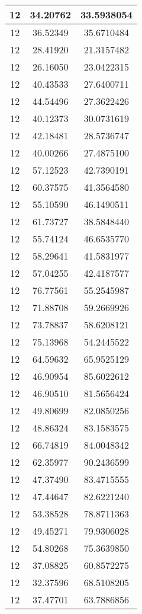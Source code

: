 \documentclass[
]{book}
\begin{document}
\begin{tabular}{c|c|c}
\hline
12 & 34.20762 & 33.5938054\\
\hline
12 & 36.52349 & 35.6710484\\
\hline
12 & 28.41920 & 21.3157482\\
\hline
12 & 26.16050 & 23.0422315\\
\hline
12 & 40.43533 & 27.6400711\\
\hline
12 & 44.54496 & 27.3622426\\
\hline
12 & 40.12373 & 30.0731619\\
\hline
12 & 42.18481 & 28.5736747\\
\hline
12 & 40.00266 & 27.4875100\\
\hline
12 & 57.12523 & 42.7390191\\
\hline
12 & 60.37575 & 41.3564580\\
\hline
12 & 55.10590 & 46.1490511\\
\hline
12 & 61.73727 & 38.5848440\\
\hline
12 & 55.74124 & 46.6535770\\
\hline
12 & 58.29641 & 41.5831977\\
\hline
12 & 57.04255 & 42.4187577\\
\hline
12 & 76.77561 & 55.2545987\\
\hline
12 & 71.88708 & 59.2669926\\
\hline
12 & 73.78837 & 58.6208121\\
\hline
12 & 75.13968 & 54.2445522\\
\hline
12 & 64.59632 & 65.9525129\\
\hline
12 & 46.90954 & 85.6022612\\
\hline
12 & 46.90510 & 81.5656424\\
\hline
12 & 49.80699 & 82.0850256\\
\hline
12 & 48.86324 & 83.1583575\\
\hline
12 & 66.74819 & 84.0048342\\
\hline
12 & 62.35977 & 90.2436599\\
\hline
12 & 47.37490 & 83.4715555\\
\hline
12 & 47.44647 & 82.6221240\\
\hline
12 & 53.38528 & 78.8711363\\
\hline
12 & 49.45271 & 79.9306028\\
\hline
12 & 54.80268 & 75.3639850\\
\hline
12 & 37.08825 & 60.8572275\\
\hline
12 & 32.37596 & 68.5108205\\
\hline
12 & 37.47701 & 63.7886856\\

\end{tabular}
\end{document}
